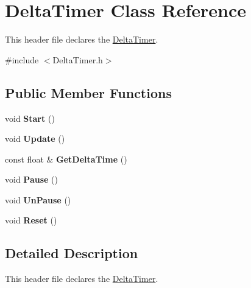 \hypertarget{class_delta_timer}{}\section{Delta\+Timer Class Reference}
\label{class_delta_timer}


This header file declares the \hyperlink{class_delta_timer}{Delta\+Timer}.  




{\ttfamily \#include $<$Delta\+Timer.\+h$>$}

\subsection*{Public Member Functions}
\begin{DoxyCompactItemize}
\item 
\hypertarget{class_delta_timer_a6faf59a8023f9782941e36e18d00e7ea}{}void {\bfseries Start} ()\label{class_delta_timer_a6faf59a8023f9782941e36e18d00e7ea}

\item 
\hypertarget{class_delta_timer_a8a14b90c655e0ad93f17e951b5ea10d5}{}void {\bfseries Update} ()\label{class_delta_timer_a8a14b90c655e0ad93f17e951b5ea10d5}

\item 
\hypertarget{class_delta_timer_a0f9a9e94e8cfea5f16b7551049ca0e39}{}const float \& {\bfseries Get\+Delta\+Time} ()\label{class_delta_timer_a0f9a9e94e8cfea5f16b7551049ca0e39}

\item 
\hypertarget{class_delta_timer_a705657924511a8042e9dd7157bb617c9}{}void {\bfseries Pause} ()\label{class_delta_timer_a705657924511a8042e9dd7157bb617c9}

\item 
\hypertarget{class_delta_timer_a383c48dd4022656ed9c5affbcb71e9a1}{}void {\bfseries Un\+Pause} ()\label{class_delta_timer_a383c48dd4022656ed9c5affbcb71e9a1}

\item 
\hypertarget{class_delta_timer_aad80d6c4f6e52ffb46de3de3c61a5140}{}void {\bfseries Reset} ()\label{class_delta_timer_aad80d6c4f6e52ffb46de3de3c61a5140}

\end{DoxyCompactItemize}


\subsection{Detailed Description}
This header file declares the \hyperlink{class_delta_timer}{Delta\+Timer}. 

